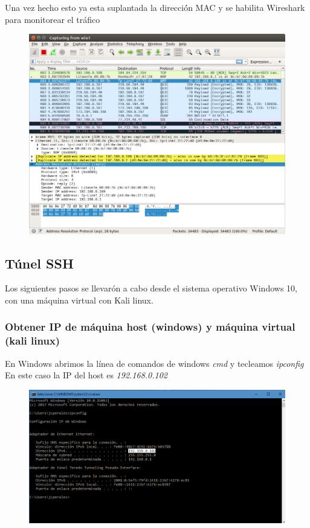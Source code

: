 \documentclass{article}
\begin{document}
Una vez hecho esto ya esta suplantada la direcci\'ón MAC y se habilita Wireshark para monitorear el tr\'afico
\begin{figure}[H]
\centering
\includegraphics[width=1\textwidth]{06-WIRESHARK1}
\end{figure}



\subsection{T\'unel SSH}
Los siguientes pasos se llevarón a cabo desde el sistema operativo Windows 10, con una m\'aquina virtual con Kali linux.

\subsubsection{Obtener IP de m\'aquina host (windows) y m\'aquina virtual (kali linux)}
En Windows abrimos la l\'inea de comandos de windows \emph{cmd} y tecleamos \emph{ipconfig}
En este caso la IP del host es \emph{192.168.0.102}

\begin{figure}[H]
\centering
\includegraphics[width=1\textwidth]{01-IPCONFIG}
\end{figure}
\end{document}
